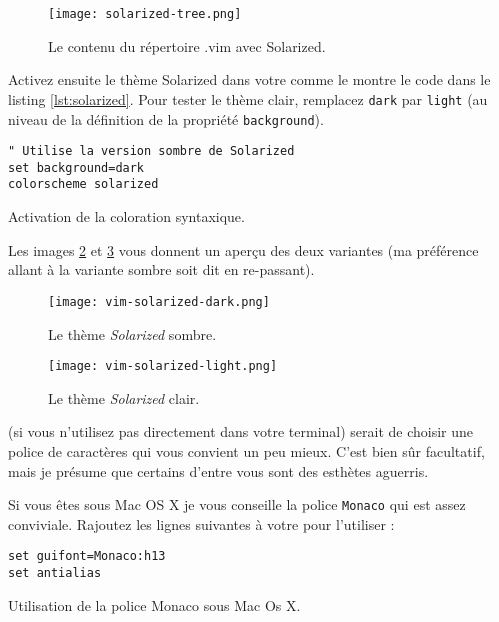 \begin{figure}%
  \center
  \texttt{[image: solarized-tree.png]}
  \caption{Le contenu du répertoire .vim avec Solarized.}
  \label{fig:solarized-tree}
\end{figure}

Activez ensuite le thème Solarized dans votre \vimrc comme le montre le code dans le listing \ref{lst:solarized}. Pour tester le thème clair, remplacez \Verb|dark| par \Verb|light| (au niveau de la définition de la propriété \Verb|background|).

\begin{listing}[H]
\begin{verbatim}
" Utilise la version sombre de Solarized
set background=dark
colorscheme solarized
\end{verbatim}
  \caption{Activation de la coloration syntaxique.}
  \label{lst:solarized}
\end{listing}

Les images \ref{fig:vim-solarized-dark} et \ref{fig:vim-solarized-light} vous donnent un aperçu des deux variantes (ma préférence allant à la variante sombre soit dit en re-passant).

\begin{figure}%
  \texttt{[image: vim-solarized-dark.png]}
  \caption{Le thème \emph{Solarized} sombre.}
  \label{fig:vim-solarized-dark}
\end{figure}

\begin{figure}%
  \texttt{[image: vim-solarized-light.png]}
  \caption{Le thème \emph{Solarized} clair.}
  \label{fig:vim-solarized-light}
\end{figure}

 (si vous n'utilisez pas \vim directement dans votre terminal) serait de choisir une police de caractères qui vous convient un peu mieux. C'est bien sûr facultatif, mais je présume que certains d'entre vous sont des esthètes aguerris.

Si vous êtes sous Mac OS X je vous conseille la police \Verb|Monaco| qui est assez conviviale. Rajoutez les lignes suivantes à votre \vimrc pour l'utiliser :

\begin{listing}[H]
\begin{verbatim}
set guifont=Monaco:h13
set antialias
\end{verbatim}
  \caption{Utilisation de la police Monaco sous Mac Os X.}
  \label{lst:monaco}
\end{listing}

